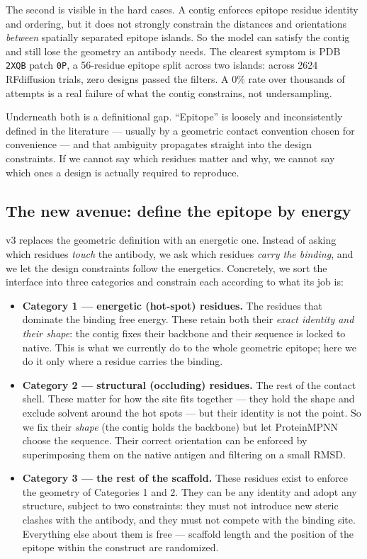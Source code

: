The second is visible in the hard cases. A contig enforces epitope residue identity and ordering,
but it does not strongly constrain the distances and orientations \emph{between} spatially separated
epitope islands. So the model can satisfy the contig and still lose the geometry an antibody needs.
The clearest symptom is PDB \texttt{2XQB} patch \texttt{0P}, a 56-residue epitope split across two
islands: across \num{2624} RFdiffusion trials, zero designs passed the filters. A $0\%$ rate over
thousands of attempts is a real failure of what the contig constrains, not undersampling.

Underneath both is a definitional gap. ``Epitope'' is loosely and inconsistently defined in the
literature --- usually by a geometric contact convention chosen for convenience --- and that
ambiguity propagates straight into the design constraints. If we cannot say which residues matter
and why, we cannot say which ones a design is actually required to reproduce.

\subsection{The new avenue: define the epitope by energy}
v3 replaces the geometric definition with an energetic one. Instead of asking which residues
\emph{touch} the antibody, we ask which residues \emph{carry the binding}, and we let the design
constraints follow the energetics. Concretely, we sort the interface into three categories and
constrain each according to what its job is:

\begin{itemize}
  \item \textbf{Category 1 --- energetic (hot-spot) residues.} The residues that dominate the
  binding free energy. These retain both their \emph{exact identity and their shape}: the contig
  fixes their backbone and their sequence is locked to native. This is what we currently do to the
  whole geometric epitope; here we do it only where a residue carries the binding.
  \item \textbf{Category 2 --- structural (occluding) residues.} The rest of the contact shell.
  These matter for how the site fits together --- they hold the shape and exclude solvent around the
  hot spots --- but their identity is not the point. So we fix their \emph{shape} (the contig holds
  the backbone) but let ProteinMPNN choose the sequence. Their correct orientation can be enforced
  by superimposing them on the native antigen and filtering on a small RMSD.
  \item \textbf{Category 3 --- the rest of the scaffold.} These residues exist to enforce the
  geometry of Categories 1 and 2. They can be any identity and adopt any structure, subject to two
  constraints: they must not introduce new steric clashes with the antibody, and they must not
  compete with the binding site. Everything else about them is free --- scaffold length and the
  position of the epitope within the construct are randomized.
\end{itemize}

